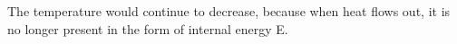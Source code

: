 The temperature would continue to decrease, because when heat flows out, it is no longer present in the form of internal energy E.